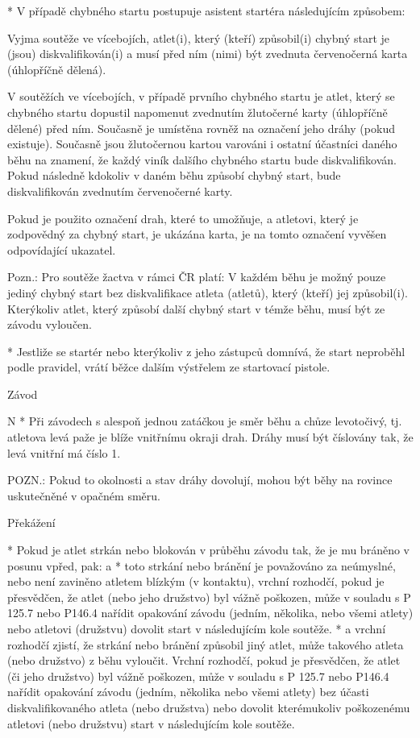 * V případě chybného startu postupuje asistent startéra následujícím způsobem:

Vyjma soutěže ve vícebojích, atlet(i), který (kteří) způsobil(i) chybný start je (jsou) diskvalifikován(i) a  musí před ním (nimi) být zvednuta červenočerná karta (úhlopříčně dělená).

V soutěžích ve vícebojích, v případě prvního chybného startu je atlet, který se chybného startu dopustil napomenut zvednutím žlutočerné karty (úhlopříčně dělené) před ním. Současně je umístěna rovněž na označení jeho dráhy (pokud existuje). Současně jsou žlutočernou kartou varováni i ostatní účastníci daného běhu na znamení, že každý viník dalšího chybného startu bude diskvalifikován. Pokud následně kdokoliv v daném běhu způsobí chybný start, bude diskvalifikován zvednutím červenočerné karty.

Pokud je použito označení drah, které to umožňuje, a atletovi, který je zodpovědný za chybný start, je ukázána karta, je na tomto označení vyvěšen odpovídající ukazatel.

Pozn.: Pro soutěže žactva v rámci ČR platí: V každém běhu je možný pouze jediný chybný start bez diskvalifikace atleta (atletů), který (kteří) jej způsobil(i). Kterýkoliv atlet, který způsobí další chybný start v témže běhu, musí být ze závodu vyloučen.

* Jestliže se startér nebo kterýkoliv z jeho zástupců domnívá, že start neproběhl podle pravidel, vrátí běžce dalším výstřelem ze startovací pistole.
\enditems

\secc Závod

\begitems \style N
* Při závodech s alespoň jednou zatáčkou je směr běhu a chůze levotočivý, tj. atletova levá paže je blíže vnitřnímu okraji drah. Dráhy musí být číslovány tak, že levá vnitřní má číslo 1.

POZN.: Pokud to okolnosti a stav dráhy dovolují, mohou být běhy na rovince uskutečněné v opačném směru.

Překážení

* Pokud je atlet strkán nebo blokován v průběhu závodu tak, že je mu bráněno v posunu vpřed, pak:
  \begitems \style a
  * toto strkání nebo bránění je považováno za neúmyslné, nebo není zaviněno atletem blízkým (v kontaktu), vrchní rozhodčí, pokud je přesvědčen, že atlet (nebo jeho družstvo) byl vážně poškozen, může v souladu s P 125.7 nebo P146.4 nařídit opakování závodu (jedním, několika, nebo všemi atlety) nebo atletovi (družstvu) dovolit start v následujícím kole soutěže.
  * a vrchní rozhodčí zjistí, že strkání nebo bránění způsobil jiný atlet, může takového atleta (nebo družstvo) z běhu vyloučit. Vrchní rozhodčí, pokud je přesvědčen, že atlet (či jeho družstvo) byl vážně poškozen, může v souladu s P 125.7 nebo P146.4 nařídit opakování závodu (jedním, několika nebo všemi atlety) bez účasti diskvalifikovaného atleta (nebo družstva) nebo dovolit kterémukoliv poškozenému atletovi (nebo družstvu) start v následujícím kole soutěže.

